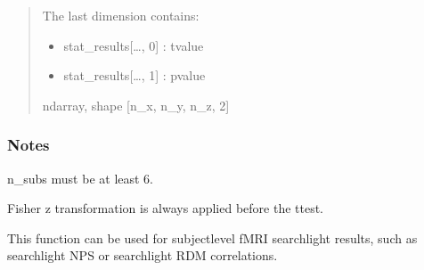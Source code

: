 \documentclass[letterpaper,10pt,english]{sphinxhowto}
\begin{document}
\begin{fulllineitems}
\begin{quote}
\begin{description}
\sphinxAtStartPar
The last dimension contains:
\begin{itemize}
\item {} 
\sphinxAtStartPar
stat\_results{[}…, 0{]} : t\sphinxhyphen{}value

\item {} 
\sphinxAtStartPar
stat\_results{[}…, 1{]} : p\sphinxhyphen{}value

\end{itemize}


\sphinxAtStartPar
ndarray, shape {[}n\_x, n\_y, n\_z, 2{]}

\end{description}\end{quote}
\subsubsection*{Notes}

\sphinxAtStartPar
n\_subs must be at least 6.

\sphinxAtStartPar
Fisher z transformation is always applied before the t\sphinxhyphen{}test.

\sphinxAtStartPar
This function can be used for subject\sphinxhyphen{}level fMRI searchlight results,
such as searchlight NPS or searchlight RDM correlations.

\end{fulllineitems}

\end{document}
